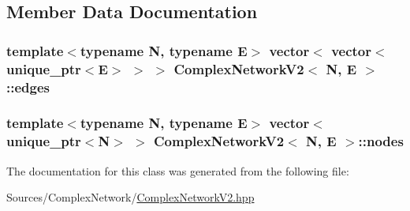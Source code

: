 \subsection{Member Data Documentation}
\hypertarget{class_complex_network_v2_acc11e6426cbfd381b54ee764dd6846df}{
\subsubsection[{edges}]{\setlength{\rightskip}{0pt plus 5cm}template$<$typename N, typename E$>$ vector$<$ vector$<$ unique\+\_\+ptr$<$E$>$ $>$ $>$ {\bf Complex\+Network\+V2}$<$ N, E $>$\+::edges\hspace{0.3cm}{\ttfamily [private]}}}\label{class_complex_network_v2_acc11e6426cbfd381b54ee764dd6846df}
\hypertarget{class_complex_network_v2_a8b02e8553951e064475a31e5e01c9186}{
\subsubsection[{nodes}]{\setlength{\rightskip}{0pt plus 5cm}template$<$typename N, typename E$>$ vector$<$ unique\+\_\+ptr$<$N$>$ $>$ {\bf Complex\+Network\+V2}$<$ N, E $>$\+::nodes\hspace{0.3cm}{\ttfamily [private]}}}\label{class_complex_network_v2_a8b02e8553951e064475a31e5e01c9186}


The documentation for this class was generated from the following file\+:\begin{DoxyCompactItemize}
\item 
Sources/\+Complex\+Network/\hyperlink{_complex_network_v2_8hpp}{Complex\+Network\+V2.\+hpp}\end{DoxyCompactItemize}
